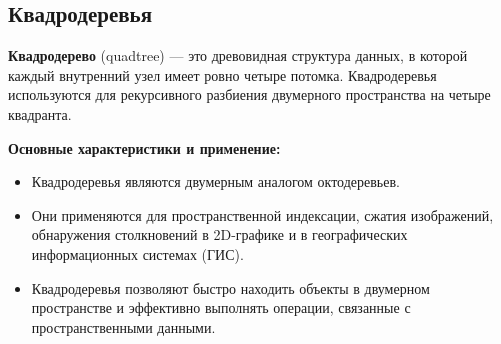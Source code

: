 \subsection{Квадродеревья}

\begin{definition}
	\textbf{Квадродерево} (quadtree) --- это древовидная структура данных, в которой каждый внутренний узел имеет ровно четыре потомка. Квадродеревья используются для рекурсивного разбиения двумерного пространства на четыре квадранта.
\end{definition}

\noindent \textbf{Основные характеристики и применение:}
\begin{itemize}
	\item Квадродеревья являются двумерным аналогом октодеревьев.
	\item Они применяются для пространственной индексации, сжатия изображений, обнаружения столкновений в 2D-графике и в географических информационных системах (ГИС).
	\item Квадродеревья позволяют быстро находить объекты в двумерном пространстве и эффективно выполнять операции, связанные с пространственными данными.
\end{itemize}